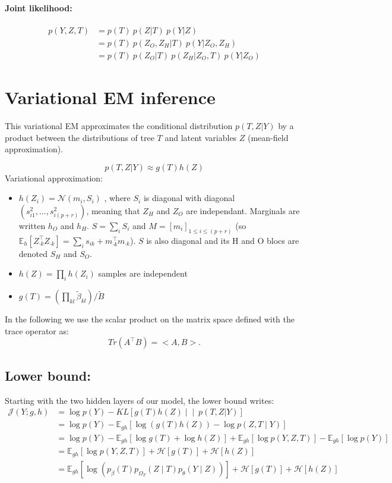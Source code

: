 \documentclass[11pt,a4paper]{article}
\newcommand{\Esp}{\mathds{E}}
\newcommand{\entr}{\mathcal{H}}
\begin{document}
\paragraph{Joint likelihood:}
\begin{align*}
p(Y,Z,T)& = p(T) \: p(Z|T) \: p(Y|Z) \\
&= p(T)\: p(Z_O,Z_H|T) \: p(Y|Z_O,Z_H) \\
&= p(T) \: p(Z_O|T) \: p(Z_H | Z_O,T)  \: p(Y|Z_O)
\end{align*} 
\section{Variational EM inference}

This variational EM approximates the conditional distribution $p(T,Z | Y)$ by a product  between the  distributions of tree $T$ and latent variables $Z$ (mean-field approximation).

$$p(T,Z | Y) \approx  g(T)h(Z)$$
Variational approximation:
\begin{itemize}
\item $ h(Z_i) =  \mathcal{N}(m_i,S_i)$ , where $S_i$ is diagonal with diagonal $(s_{i1}^2, ... , s_{i(p+r)}^2)$, meaning that $Z_H$ and $Z_O$ are independant. Marginals are written $h_O$  and  $h_H$. $S=\sum_i S_i$  and $ M =  [m_i]_{1 \leq i \leq (p+r)}$ (so $\Esp_h[Z_{\cdot k}^\intercal Z_{\cdot k}] = \sum_i s_{ik} + m_{\cdot k}^\intercal m_{\cdot k}$). $S$ is also diagonal and its H and O blocs are denoted $S_H$ and $S_O$.
\item $ h(Z) = \prod_i h(Z_i)$ samples are independent 
\item $ g(T) = \left(\prod_{kl} \widetilde{\beta}_{kl} \right) / \widetilde{B}$
\end{itemize}

In the following we use the scalar product on the matrix space defined with the trace operator as: 
$$  Tr(A^\intercal B) = <A,B> .$$
\subsection{Lower bound:}
Starting with the two hidden layers of our model, the lower bound writes:
\begin{align*}
\mathcal{J}(Y; g,h)&=\log p(Y) - KL\left[g(T) h(Z) \middle\vert\middle\vert\ p(T,Z | Y)\right]\\
&= \log p(Y) - \Esp_{gh}[\log( g(T) h(Z)) - \log p(Z,T\mid Y) ]\\
&= \log p(Y) - \Esp_{gh}[\log g(T) + \log h(Z) ] + \Esp_{gh}[\log p(Y,Z,T)] - \Esp_{gh}[\log p(Y)]\\
&= \Esp_{gh} [\log p(Y,Z,T)] + \entr[g(T)] + \entr[h(Z)]\\
&= \Esp_{gh} [\log (p_\beta(T)p_{\Omega_T}(Z\mid T)p_\theta(Y\mid Z))] + \entr[g(T)] + \entr[h(Z)]
\end{align*}
\end{document}
